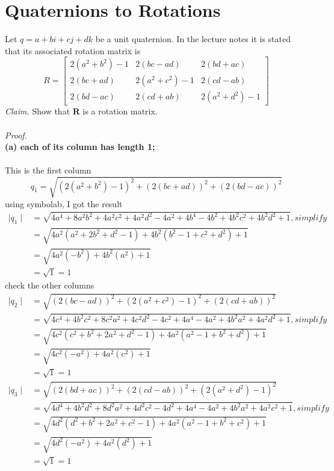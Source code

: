 \documentclass[12pt,letterpaper]{article}
\begin{document}
\section{Quaternions to Rotations}
Let $q = a + bi + cj + dk$ be a unit quaternion. In the lecture notes it is stated that its associated
rotation matrix is
$$
R =
\begin{bmatrix}
    2(a^{2} + b^{2}) - 1 & 2(bc - ad) & 2(bd + ac)
    \\
    2(bc + ad) & 2(a^{2} + c^{2}) - 1 & 2(cd - ab)
    \\
    2(bd - ac) & 2(cd + ab) & 2(a^{2} + d^{2}) -1
\end{bmatrix}
$$
\textit{Claim.} Show that \textbf{R} is a rotation matrix.
\\
\\
\textit{Proof.}\\
\textbf{(a) each of its column has length 1;}
\\
\\
This is the first column
$$
    q_{1} = \sqrt{(2(a^{2} + b^{2}) - 1)^{2} + (2(bc + ad))^{2} + (2(bd-ac))^{2}}
$$
using symbolab, I got the result
$$
    \begin{aligned}
        \mid q_{1} \mid & = \sqrt{4a^{4} + 8a^{2}b^{2} + 4a^{2}c^{2} + 4a^{2}d^{2} - 4a^{2} + 4b^{4}-4b^{2} + 4b^{2}c^{2} + 4b^{2}d^{2} + 1}, simplify
        \\
        & = \sqrt{4a^{2}(a^{2} + 2b^{2} + d^{2} - 1) + 4b^{2}(b^{2} - 1 + c^{2} + d^{2}) + 1}
        \\
        & = \sqrt{4a^{2}(-b^{2}) + 4b^{2}(a^{2}) + 1}
        \\
        & = \sqrt{1} = 1
    \end{aligned}
$$
check the other columns
$$
    \begin{aligned}
        \mid q_2 \mid & = \sqrt{(2(bc - ad))^{2} + (2(a^{2} + c^{2}) - 1)^{2} + (2(cd + ab))^{2}}
        \\
        & = \sqrt{4c^{4} + 4b^{2}c^{2} + 8c^{2}a^{2} + 4c^{2}d^{2} - 4c^{2} + 4a^{4} - 4a^{2} + 4b^{2}a^{2} + 4a^{2}d^{2} + 1}, simplify
        \\
        & = \sqrt{4c^{2}(c^{2} + b^{2} + 2a^{2} + d^{2} - 1) +4a^{2}(a^{2} - 1 + b^{2} + d^{2}) + 1}
        \\
        & = \sqrt{4c^{2}(-a^{2}) + 4a^{2}(c^{2}) + 1}
        \\
        & = \sqrt{1} = 1
    \end{aligned}
$$
$$
    \begin{aligned}
        \mid q_3 \mid & = \sqrt{(2(bd + ac))^{2} + (2(cd - ab))^{2} + (2(a^{2} + d^{2}) - 1)^{2}}
        \\
        & = \sqrt{4d^{4} + 4b^{2}d^{2} + 8d^{2}a^{2} + 4d^{2}c^{2} - 4d^{2} + 4a^{4} - 4a^{2} + 4b^{2}a^{2} + 4a^{2}c^{2} + 1}, simplify
        \\
        & = \sqrt{4d^{2}(d^{2} + b^{2} + 2a^{2} + c^{2} - 1) +4a^{2}(a^{2} - 1 + b^{2} + c^{2}) + 1}
        \\
        & = \sqrt{4d^{2}(-a^{2}) + 4a^{2}(d^{2}) + 1}
        \\
        & = \sqrt{1} = 1
    \end{aligned}
$$
\end{document}
